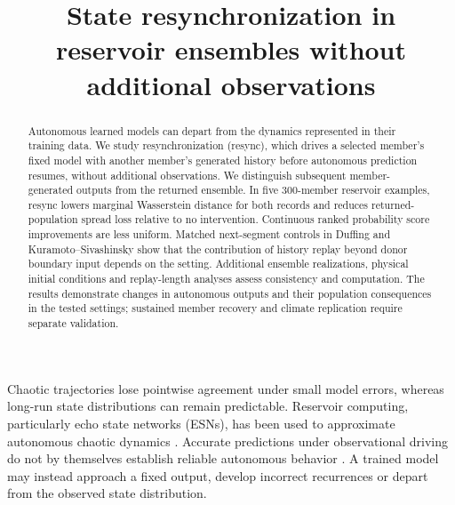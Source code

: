 \documentclass[gmd,manuscript]{copernicus}
\begin{document}
\title{State resynchronization in reservoir ensembles without additional observations}
\received{}
\pubdiscuss{}
\revised{}
\accepted{}
\published{}
\maketitle
\begin{abstract}
Autonomous learned models can depart from the dynamics represented in their training data. We study resynchronization (resync), which drives a selected member's fixed model with another member's generated history before autonomous prediction resumes, without additional observations. We distinguish subsequent member-generated outputs from the returned ensemble. In five 300-member reservoir examples, resync lowers marginal Wasserstein distance for both records and reduces returned-population spread loss relative to no intervention. Continuous ranked probability score improvements are less uniform. Matched next-segment controls in Duffing and Kuramoto--Sivashinsky show that the contribution of history replay beyond donor boundary input depends on the setting. Additional ensemble realizations, physical initial conditions and replay-length analyses assess consistency and computation. The results demonstrate changes in autonomous outputs and their population consequences in the tested settings; sustained member recovery and climate replication require separate validation.

\end{abstract}
\introduction

Chaotic trajectories lose pointwise agreement under small model errors, whereas long-run state distributions can remain predictable. Reservoir computing, particularly echo state networks (ESNs), has been used to approximate autonomous chaotic dynamics \citep{jaeger2004harnessing,pathak2017using,pathak2018model}. Accurate predictions under observational driving do not by themselves establish reliable autonomous behavior \citep{haluszczynski2019good,hart2023attractor,platt2021robust}. A trained model may instead approach a fixed output, develop incorrect recurrences or depart from the observed state distribution.
\end{document}
